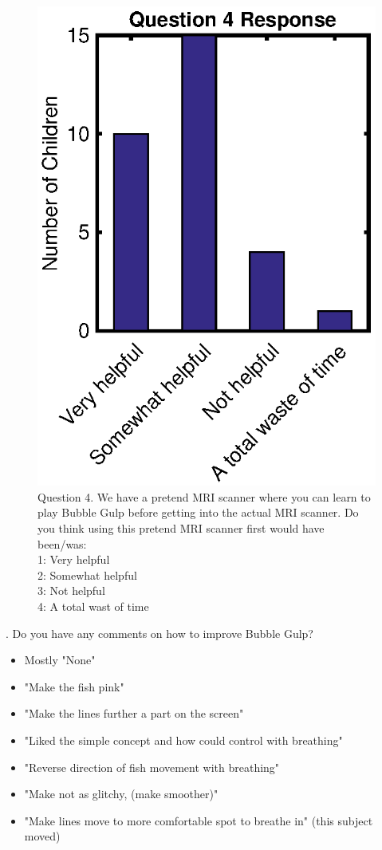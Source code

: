 	\begin{figure}
		\centering
		\includegraphics{figures/gamepaper/Question4}
		\caption[Feedback Videogame Survey Question 4]{Question 4.	We have a pretend MRI scanner where you can learn to play Bubble Gulp before getting into the actual MRI scanner. Do you think using this pretend MRI scanner first would have been/was: \\ 1: Very helpful \\ 2: Somewhat helpful \\3: Not helpful \\ 4: A total wast of time}
		\label{fig:question4}
	\end{figure}
	
	. Do you have any comments on how to improve Bubble Gulp?
	\begin{itemize}
		\setlength\itemsep{-1em}
		\item Mostly "None" \smallskip
		\item "Make the fish pink"
		\item "Make the lines further a part on the screen"
		\item "Liked the simple concept and how could control with breathing"
		\item "Reverse direction of fish movement with breathing"
		\item "Make not as glitchy, (make smoother)"
		\item "Make lines move to more comfortable spot to breathe in" (this subject moved)
	\end{itemize}
	
